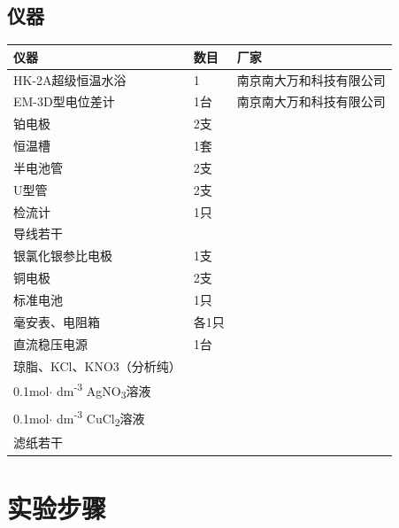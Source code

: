 \documentclass[11pt]{report}
\begin{document}
\section{仪器}
\label{sec:org1a1468d}
\begin{center}
\begin{tabular}{lll}
仪器 & 数目 & 厂家\\
\hline
HK-2A超级恒温水浴 & 1 & 南京南大万和科技有限公司\\
EM-3D型电位差计 & 1台 & 南京南大万和科技有限公司\\
铂电极 & 2支 & \\
恒温槽 & 1套 & \\
半电池管 & 2支 & \\
U型管 & 2支 & \\
检流计 & 1只 & \\
导线若干 &  & \\
银氯化银参比电极 & 1支 & \\
铜电极 & 2支 & \\
标准电池 & 1只 & \\
毫安表、电阻箱 & 各1只 & \\
直流稳压电源 & 1台 & \\
琼脂、KCl、KNO3（分析纯） &  & \\
0.1mol\(\cdot\) dm\textsuperscript{-3} AgNO\textsubscript{3}溶液 &  & \\
0.1mol\(\cdot\) dm\textsuperscript{-3} CuCl\textsubscript{2}溶液 &  & \\
滤纸若干 &  & \\
\end{tabular}
\end{center}





\chapter{实验步骤}
\label{sec:org66b012e}
\end{document}
